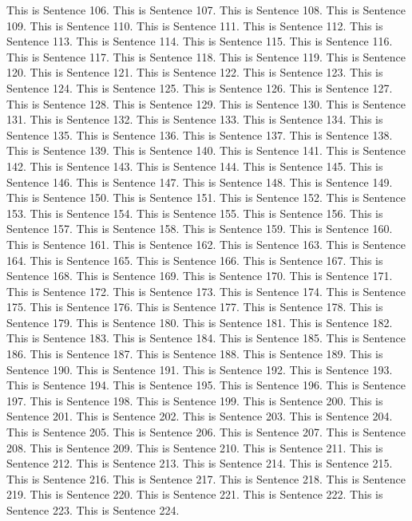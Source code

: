 \documentclass{article}
\begin{document}
This is Sentence 106.
This is Sentence 107.
This is Sentence 108.
This is Sentence 109.
This is Sentence 110.
This is Sentence 111.
This is Sentence 112.
This is Sentence 113.
This is Sentence 114.
This is Sentence 115.
This is Sentence 116.
This is Sentence 117.
This is Sentence 118.
This is Sentence 119.
This is Sentence 120.
This is Sentence 121.
This is Sentence 122.
This is Sentence 123.
This is Sentence 124.
This is Sentence 125.
This is Sentence 126.
This is Sentence 127.
This is Sentence 128.
This is Sentence 129.
This is Sentence 130.
This is Sentence 131.
This is Sentence 132.
This is Sentence 133.
This is Sentence 134.
This is Sentence 135.
This is Sentence 136.
This is Sentence 137.
This is Sentence 138.
This is Sentence 139.
This is Sentence 140.
This is Sentence 141.
This is Sentence 142.
This is Sentence 143.
This is Sentence 144.
This is Sentence 145.
This is Sentence 146.
This is Sentence 147.
This is Sentence 148.
This is Sentence 149.
This is Sentence 150.
This is Sentence 151.
This is Sentence 152.
This is Sentence 153.
This is Sentence 154.
This is Sentence 155.
This is Sentence 156.
This is Sentence 157.
This is Sentence 158.
This is Sentence 159.
This is Sentence 160.
This is Sentence 161.
This is Sentence 162.
This is Sentence 163.
This is Sentence 164.
This is Sentence 165.
This is Sentence 166.
This is Sentence 167.
This is Sentence 168.
This is Sentence 169.
This is Sentence 170.
This is Sentence 171.
This is Sentence 172.
This is Sentence 173.
This is Sentence 174.
This is Sentence 175.
This is Sentence 176.
This is Sentence 177.
This is Sentence 178.
This is Sentence 179.
This is Sentence 180.
This is Sentence 181.
This is Sentence 182.
This is Sentence 183.
This is Sentence 184.
This is Sentence 185.
This is Sentence 186.
This is Sentence 187.
This is Sentence 188.
This is Sentence 189.
This is Sentence 190.
This is Sentence 191.
This is Sentence 192.
This is Sentence 193.
This is Sentence 194.
This is Sentence 195.
This is Sentence 196.
This is Sentence 197.
This is Sentence 198.
This is Sentence 199.
This is Sentence 200.
This is Sentence 201.
This is Sentence 202.
This is Sentence 203.
This is Sentence 204.
This is Sentence 205.
This is Sentence 206.
This is Sentence 207.
This is Sentence 208.
This is Sentence 209.
This is Sentence 210.
This is Sentence 211.
This is Sentence 212.
This is Sentence 213.
This is Sentence 214.
This is Sentence 215.
This is Sentence 216.
This is Sentence 217.
This is Sentence 218.
This is Sentence 219.
This is Sentence 220.
This is Sentence 221.
This is Sentence 222.
This is Sentence 223.
This is Sentence 224.
\end{document}

